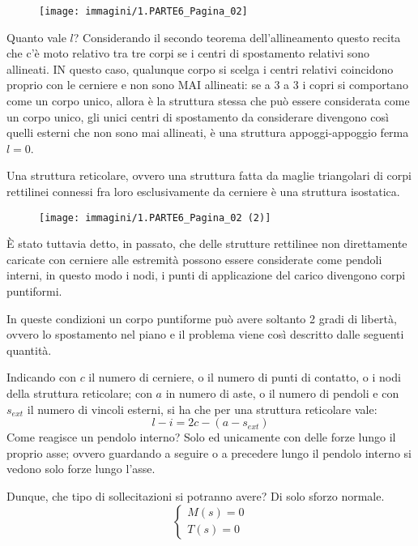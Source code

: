 \documentclass{article}
\begin{document}
\begin{adjustwidth}{2in}{}
\begin{figure}[H]
	\centering
	\texttt{[image: immagini/1.PARTE6\_Pagina\_02]}
\end{figure}

	Quanto vale $l$? Considerando il secondo teorema dell'allineamento questo recita che c'è moto relativo tra tre corpi se i centri di spostamento relativi sono allineati. IN questo caso, qualunque corpo si scelga i centri relativi coincidono proprio con le cerniere e non sono MAI allineati: se a 3 a 3 i copri si comportano come un corpo unico, allora è la struttura stessa che può essere considerata come un corpo unico, gli unici centri di spostamento da considerare divengono così quelli esterni che non sono mai allineati, è una struttura appoggi-appoggio ferma $l=0$. \newline 

	Una struttura reticolare, ovvero una struttura fatta da maglie triangolari di corpi rettilinei connessi fra loro esclusivamente da cerniere è una struttura isostatica. 
	
\begin{figure}[H]
	\centering
	\texttt{[image: immagini/1.PARTE6\_Pagina\_02 (2)]}
\end{figure}	
	È stato tuttavia detto, in passato, che delle strutture rettilinee non direttamente caricate con cerniere alle estremità possono essere considerate come pendoli interni, in questo modo i nodi, i punti di applicazione del carico divengono corpi puntiformi.
	
	In queste condizioni un corpo puntiforme può avere soltanto 2 gradi di libertà, ovvero lo spostamento nel piano e il problema viene così descritto dalle seguenti quantità.
	
	Indicando con $c$ il numero di cerniere, o il numero di punti di contatto, o i nodi della struttura reticolare; con $a$ in numero di aste, o il numero di pendoli e con $s_{ext}$ il numero di vincoli esterni, si ha che per una struttura reticolare vale: 
	\[ l - i = 2c -(a-s_{ext}) \] 
	Come reagisce un pendolo interno? Solo ed unicamente con delle forze lungo il proprio asse; ovvero guardando a seguire o a precedere lungo il pendolo interno si vedono solo forze lungo l'asse. 
	
	Dunque, che tipo di sollecitazioni si potranno avere? Di solo sforzo normale. 
	\[\begin{cases}
		M(s)=0\\
		T(s)=0
	\end{cases}\]


\end{adjustwidth}
\end{document}
